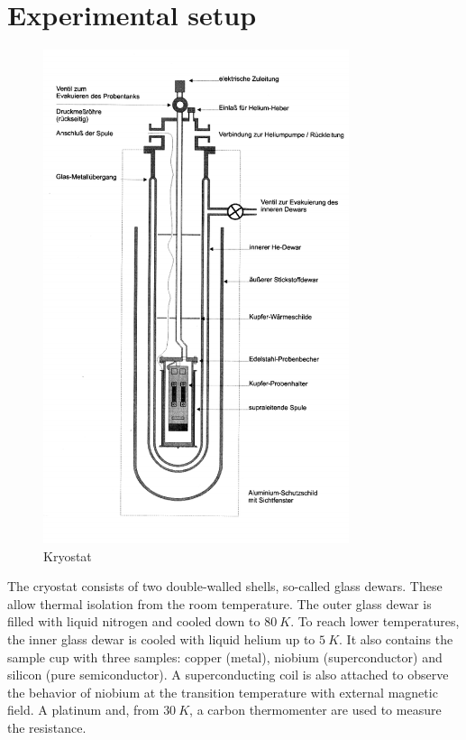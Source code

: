 
\section{Experimental setup}
\label{sec:setup}


\begin{figure}
    \centering
    \includegraphics[width=0.8\textwidth]{./fig/kryo.png}
    \caption{Kryostat}
    \label{fig:kryo}
\end{figure}

The cryostat consists of two double-walled shells, so-called glass dewars. These allow thermal isolation from the room temperature. The outer glass dewar is filled with liquid nitrogen and cooled down to $\SI{80}{K}$. To reach lower temperatures, the inner glass dewar is cooled with liquid helium up to $\SI{5}{K}$. It also contains the sample cup with three samples: copper (metal), niobium (superconductor) and silicon (pure semiconductor). A superconducting coil is also attached to observe the behavior of niobium at the transition temperature with external magnetic field. 
A platinum and, from $\SI{30}{K}$, a carbon thermomenter are used to measure the resistance. 